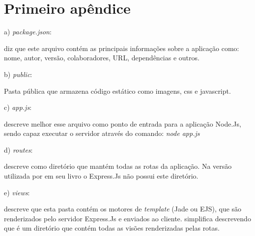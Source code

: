 \setcounter{figure}{0}

\chapter{Primeiro apêndice}
\label{apend:express-skel}

\vspace{-1.9cm}

\begin{compactitem}
  \item[a)] \textit{package.json}:
  
  \cite{Pereira:2013} diz que este arquivo contém as principais informações sobre a aplicação como: 
  nome, autor, versão, colaboradores, URL, dependências e outros.
  
  \item[b)] \textit{public}:
  
  Pasta pública que armazena código estático como imagens, css e javascript. \cite{Pereira:2013}
  
  \item[c)] \textit{app.js}:
  
  \cite{Wilson:2013} descreve melhor esse arquivo como ponto de entrada para a aplicação Node.Js, 
  sendo capaz executar o servidor através do comando: \textit{node app.js}
  
  \item[d)] \textit{routes}:
  
  \cite{Pereira:2013} descreve como diretório que mantém todas as rotas da aplicação. 
  Na versão utilizada por  em seu livro o Express.Js não possui este diretório.
  
  \item[e)] \textit{views}: 
  
  \cite{Wilson:2013} descreve que esta pasta contém os motores de \textit{template} (Jade ou EJS), 
  que são renderizados pelo servidor Express.Js e enviados ao cliente. \cite{Pereira:2013}
  simplifica descrevendo que é um diretório que contém todas as visões renderizadas pelas rotas.
  
\end{compactitem}